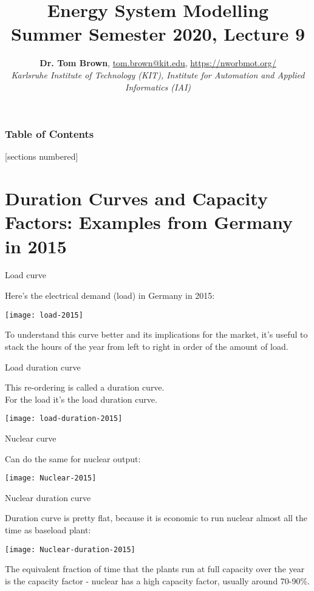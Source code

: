 \documentclass[10pt,aspectratio=169,dvipsnames]{beamer}
\title{Energy System Modelling\\ Summer Semester 2020, Lecture 9}
\author{
  {\bf Dr. Tom Brown}, \href{mailto:tom.brown@kit.edu}{tom.brown@kit.edu}, \url{https://nworbmot.org/}\\
  \emph{Karlsruhe Institute of Technology (KIT), Institute for Automation and Applied Informatics (IAI)}
}
\date{}
\begin{document}
\maketitle


\begin{frame}

  \frametitle{Table of Contents}
  [sections numbered]
  \tableofcontents[hideallsubsections]
\end{frame}


\section{Duration Curves and Capacity Factors: Examples from Germany in 2015}

\begin{frame}{Load curve}

  Here's the electrical demand (load) in Germany in 2015:

  \centering
  \texttt{[image: load-2015]}

  \raggedright

  To understand this curve better and its implications for the market,
  it's useful to stack the hours of the year from left to right in
  order of the amount of load.

\end{frame}


\begin{frame}{Load duration curve}

  This re-ordering is called a \alert{duration curve}.\\
  For the load it's the \alert{load duration curve}.

  \centering
  \texttt{[image: load-duration-2015]}

\end{frame}

\begin{frame}{Nuclear curve}

  Can do the same for nuclear output:

  \centering
  \texttt{[image: Nuclear-2015]}

\end{frame}

\begin{frame}{Nuclear duration curve}

  Duration curve is pretty flat, because it is economic to run nuclear almost all the time as  \alert{baseload plant}:

  \centering
  \texttt{[image: Nuclear-duration-2015]}

  \raggedright
  The equivalent fraction of time that the plants run at full capacity over the year is the \alert{capacity factor} - nuclear has a high capacity factor, usually around 70-90\%.
\end{frame}
\end{document}
